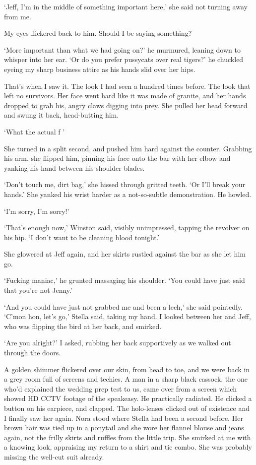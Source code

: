 `Jeff, I'm in the middle of something important here,' she said not
turning away from me.

My eyes flickered back to him. Should I be saying something?

`More important than what we had going on?' he murmured, leaning down
to whisper into her ear. `Or do you prefer pussycats over real
tigers?' he chuckled eyeing my sharp business attire as his hands slid
over her hips.

That's when I saw it. The look I had seen a hundred times before. The
look that left no survivors. Her face went hard like it was made of
granite, and her hands dropped to grab his, angry claws digging into
prey. She pulled her head forward and swung it back, head-butting him.

`What the actual f \textemdash{}'

She turned in a split second, and pushed him hard against the
counter. Grabbing his arm, she flipped him, pinning his face onto the
bar with her elbow and yanking his hand between his shoulder blades.

`Don't touch me, dirt bag,' she hissed through gritted teeth. `Or I'll
break your hands.' She yanked his wrist harder as a not-so-subtle
demonstration. He howled.

`I'm sorry, I'm sorry!'

`That's enough now,' Winston said, visibly unimpressed, tapping the
revolver on his hip. `I don't want to be cleaning blood tonight.'

She glowered at Jeff again, and her skirts rustled against the bar as
she let him go.

`Fucking maniac,' he grunted massaging his shoulder. `You could have
just said that you're not Jenny.'

`And you could have just not grabbed me and been a lech,' she said
pointedly. `C'mon hon, let's go,' Stella said, taking my hand. I
looked between her and Jeff, who was flipping the bird at her back,
and smirked.

`Are you alright?' I asked, rubbing her back supportively as we walked
out through the doors.

A golden shimmer flickered over our skin, from head to toe, and we
were back in a grey room full of screens and techies. A man in a sharp
black cassock, the one who'd explained the wedding prep test to us,
came over from a screen which showed HD CCTV footage of the
speakeasy. He practically radiated. He clicked a button on his
earpiece, and clapped. The holo-lenses clicked out of existence and I
finally saw her again. Nora stood where Stella had been a second
before. Her brown hair was tied up in a ponytail and she wore her
flannel blouse and jeans again, not the frilly skirts and ruffles from
the little trip. She smirked at me with a knowing look, appraising my
return to a shirt and tie combo. She was probably missing the well-cut
suit already.

